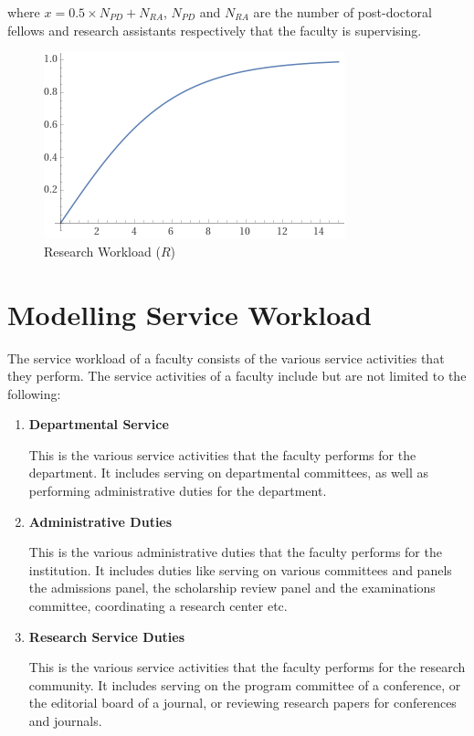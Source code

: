 where $ x = 0.5 \times N_{PD} +  N_{RA}$, $N_{PD}$ and $N_{RA}$ are the number of post-doctoral fellows and research assistants respectively that the faculty is supervising.

\begin{figure}[htpb]
  \centering
  \includegraphics[width=0.5\linewidth]{images/research_workload_plot.png}
  \caption{Research Workload ($R$)}
  \label{fig:research_workload_plot}
\end{figure}


\section{Modelling Service Workload}
\label{sec:modelling_service_workload}

The service workload of a faculty consists of the various service activities that they perform. The service activities of a faculty include but are not limited to the following:

\begin{enumerate}

  \item \textbf{Departmental Service}

        This is the various service activities that the faculty performs for the department. It includes serving on departmental committees, as well as performing administrative duties for the department.

  \item \textbf{Administrative Duties}

        This is the various administrative duties that the faculty performs for the institution. It includes duties like serving on various committees and panels the admissions panel, the scholarship review panel and the examinations committee, coordinating a research center etc.

  \item \textbf{Research Service Duties}

        This is the various service activities that the faculty performs for the research community. It includes serving on the program committee of a conference, or the editorial board of a journal, or reviewing research papers for conferences and journals.

\end{enumerate}

